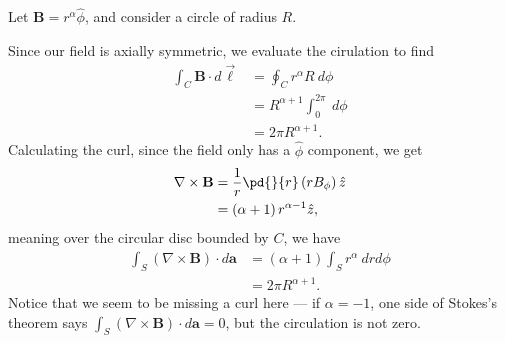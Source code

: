 \documentclass[10pt]{mypackage}
\begin{document}
\begin{example}
  Let $\mathbf{B} = r^{\alpha}\hat{\phi}$, and consider a circle of radius $R$.\newline

  Since our field is axially symmetric, we evaluate the cirulation to find
  \begin{align*}
    \int_{C}^{} \mathbf{B}\cdot d\vec{\ell} &= \oint_{C}^{} r^{\alpha}R\:d\phi\\
                                            &= R^{\alpha + 1}\int_{0}^{2\pi} \:d\phi\\
                                            &= 2\pi R^{\alpha + 1}.
  \end{align*}
  Calculating the curl, since the field only has a $\hat{\phi}$ component, we get
  \begin{align*}
    \nabla \times \mathbf{B} &= \frac{1}{r}\pd{}{r}\left(rB_{\phi}\right)\hat{z}\\
                             &= \left(\alpha + 1\right)r^{\alpha - 1}\hat{z},
  \end{align*}
  meaning over the circular disc bounded by $C$, we have
  \begin{align*}
    \int_{S}^{} \left(\nabla \times \mathbf{B}\right)\cdot d\mathbf{a} &= \left(\alpha + 1\right)\int_{S}^{} r^{\alpha}\:drd\phi\\
                                                                       &= 2\pi R^{\alpha + 1}.
  \end{align*}
  Notice that we seem to be missing a curl here --- if $\alpha = -1$, one side of Stokes's theorem says $\int_{S}^{} \left(\nabla \times \mathbf{B}\right)\cdot d\mathbf{a} = 0$, but the circulation is not zero.
\end{example}
\end{document}
